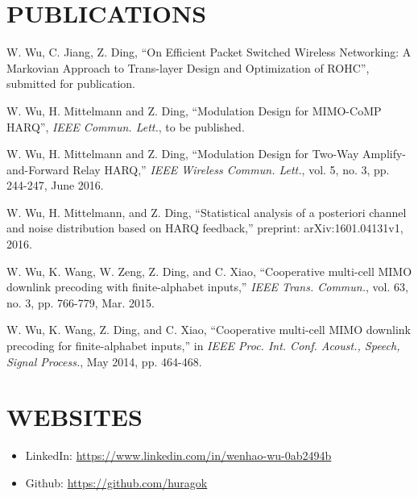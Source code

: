 \documentclass[margin]{res} %
\begin{document}
\begin{resume}
        
    
        \section{PUBLICATIONS}
        \begin{enumerate}[label={[\arabic*]}]
          \item W. Wu, C. Jiang, Z. Ding, ``On Efficient Packet Switched
          Wireless Networking: A Markovian Approach to Trans-layer Design and
          Optimization of ROHC'', submitted for publication.
          \item W. Wu, H. Mittelmann and Z. Ding, ``Modulation Design for
          MIMO-CoMP HARQ'', \emph{IEEE Commun. Lett.}, to be published.
          \item W. Wu, H. Mittelmann and Z. Ding, ``Modulation Design for
          Two-Way Amplify-and-Forward Relay HARQ,'' \emph{IEEE Wireless
          Commun. Lett.}, vol. 5, no. 3, pp. 244-247, June 2016.
          \item W. Wu, H. Mittelmann, and Z. Ding, ``Statistical analysis of a
          posteriori channel and noise distribution based on HARQ feedback,”
          preprint: arXiv:1601.04131v1, 2016.
          \item W. Wu, K. Wang, W. Zeng, Z. Ding, and C. Xiao,
          ``Cooperative multi-cell MIMO downlink precoding with
          finite-alphabet inputs,'' \emph{IEEE Trans. Commun.}, vol. 63, no.
          3, pp. 766-779, Mar. 2015.
          \item W. Wu, K. Wang, Z. Ding, and C. Xiao, ``Cooperative multi-cell
          MIMO downlink precoding for finite-alphabet inputs,'' in
          \emph{IEEE Proc. Int. Conf. Acoust., Speech, Signal Process.}, May
          2014, pp. 464-468.
        \end{enumerate}
    
    
        \section{WEBSITES} 
        \begin{itemize}
            \item LinkedIn: \url{https://www.linkedin.com/in/wenhao-wu-0ab2494b}
            \item Github: \url{https://github.com/huragok}
        \end{itemize}
        

\end{resume}
\end{document}
